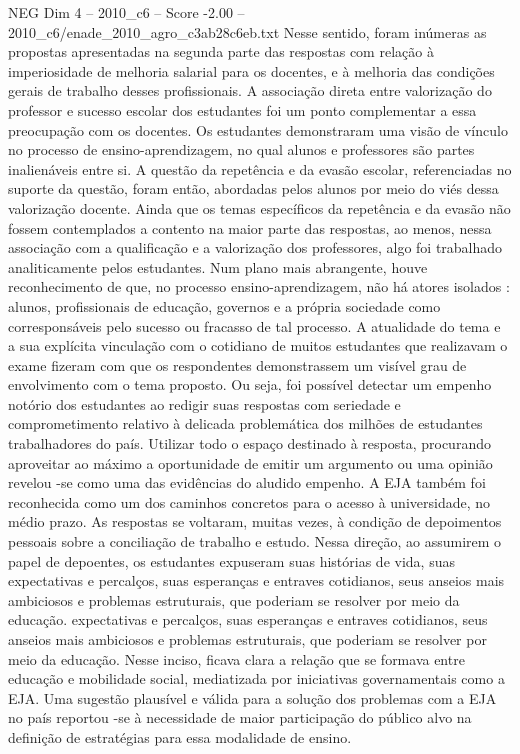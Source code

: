 \begin{textsample}{NEG Dim 4 – 2010\_c6 – Score -2.00 – 2010\_c6/enade\_2010\_agro\_c3ab28c6eb.txt}
Nesse sentido, foram inúmeras as propostas apresentadas na segunda parte das respostas com relação à imperiosidade de melhoria salarial para os docentes, e à melhoria das condições gerais de trabalho desses profissionais.
A associação direta entre valorização do professor e sucesso escolar dos estudantes foi um ponto complementar a essa preocupação com os docentes.
Os estudantes demonstraram uma visão de vínculo no processo de ensino-aprendizagem, no qual alunos e professores são partes inalienáveis entre si.
A questão da repetência e da evasão escolar, referenciadas no suporte da questão, foram então, abordadas pelos alunos por meio do viés dessa valorização docente.
Ainda que os temas específicos da repetência e da evasão não fossem contemplados a contento na maior parte das respostas, ao menos, nessa associação com a qualificação e a valorização dos professores, algo foi trabalhado analiticamente pelos estudantes.
Num plano mais abrangente, houve reconhecimento de que, no processo ensino-aprendizagem, não há atores isolados : alunos, profissionais de educação, governos e a própria sociedade como corresponsáveis pelo sucesso ou fracasso de tal processo.
A atualidade do tema e a sua explícita vinculação com o cotidiano de muitos estudantes que realizavam o exame fizeram com que os respondentes demonstrassem um visível grau de envolvimento com o tema proposto.
Ou seja, foi possível detectar um empenho notório dos estudantes ao redigir suas respostas com seriedade e comprometimento relativo à delicada problemática dos milhões de estudantes trabalhadores do país.
Utilizar todo o espaço destinado à resposta, procurando aproveitar ao máximo a oportunidade de emitir um argumento ou uma opinião revelou -se como uma das evidências do aludido empenho.
A EJA também foi reconhecida como um dos caminhos concretos para o acesso à universidade, no médio prazo.
As respostas se voltaram, muitas vezes, à condição de depoimentos pessoais sobre a conciliação de trabalho e estudo.
Nessa direção, ao assumirem o papel de depoentes, os estudantes expuseram suas histórias de vida, suas expectativas e percalços, suas esperanças e entraves cotidianos, seus anseios mais ambiciosos e problemas estruturais, que poderiam se resolver por meio da educação. expectativas e percalços, suas esperanças e entraves cotidianos, seus anseios mais ambiciosos e problemas estruturais, que poderiam se resolver por meio da educação.
Nesse inciso, ficava clara a relação que se formava entre educação e mobilidade social, mediatizada por iniciativas governamentais como a EJA.
Uma sugestão plausível e válida para a solução dos problemas com a EJA no país reportou -se à necessidade de maior participação do público alvo na definição de estratégias para essa modalidade de ensino.

\end{textsample}

